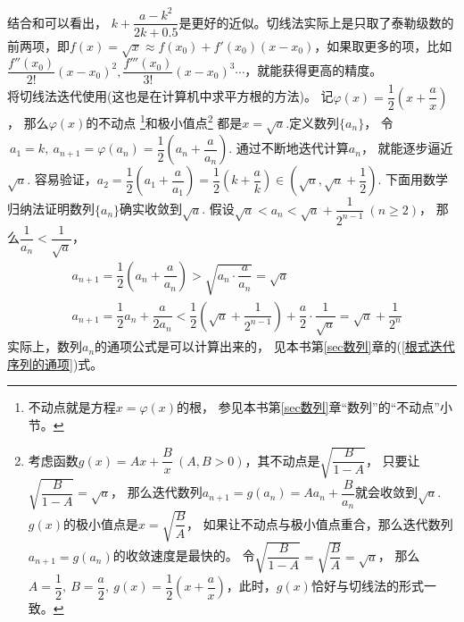 \begin{itemize}[leftmargin=\inteval{\myitemleftmargin}pt,itemsep=
   \inteval{\myitemitempsep}pt,topsep=\inteval{\myitemtopsep}pt]
结合和可以看出，
$ k+\dfrac{a-k^2}{2k+0.5} $是更好的近似。切线法实际上是只取了泰勒级数的前两项，即$ f(x)=\sqrt{x} \approx f(x_0)+f'(x_0)(x-x_0) $，如果取更多的项，比如$ \dfrac{f''(x_0)}{2!}(x-x_0)^2,
\dfrac{f'''(x_0)}{3!}(x-x_0)^3\cdots $，就能获得更高的精度。\\
将切线法迭代使用(这也是在计算机中求平方根的方法)。
记$ \varphi(x)=\dfrac{1}{2}\left(x+\dfrac{a}{x}\right) $，
那么$ \varphi(x) $的不动点
\footnote{不动点就是方程$ x=\varphi(x) $的根，
参见本书第\ref{sec数列}章“数列”的“不动点”小节。}和极小值点\footnote{
考虑函数$ g(x)=Ax+\dfrac{B}{x}\ (A,B>0) $，其不动点是$ \sqrt{\dfrac{B}{1-A}} $，
只要让$ \sqrt{\dfrac{B}{1-A}}=\sqrt{a} $，
那么迭代数列$ a_{n+1}=g(a_n)=Aa_n+\dfrac{B}{a_n} $就会收敛到$ \sqrt{a} $.
$ g(x) $的极小值点是$ x=\sqrt{\dfrac{B}{A}} $，
如果让不动点与极小值点重合，那么迭代数列$ a_{n+1}=g(a_n) $的收敛速度是最快的。
令$ \sqrt{\dfrac{B}{1-A}}=\sqrt{\dfrac{B}{A}}=\sqrt{a} $，
那么$ A=\dfrac{1}{2},\ B=\dfrac{a}{2},\ g(x)=\dfrac{1}{2}\left(
x+\dfrac{a}{x}\right) $，此时，$ g(x) $恰好与切线法的形式一致。}
都是$ x=\sqrt{a} $.定义数列$ \{a_n\} $，
令$\ a_1=k,\ a_{n+1}=\varphi(a_n)=\dfrac{1}{2}\left(
a_n+\dfrac{a}{a_n}\right) $. 通过不断地迭代计算$ a_n $，
就能逐步逼近$ \sqrt{a} $.
容易验证，$ a_{2}=\dfrac{1}{2}\left(a_1+\dfrac{a}{a_1}\right)
=\dfrac{1}{2}\left(k+\dfrac{a}{k}\right)
\in (\sqrt{a},\sqrt{a}+\dfrac{1}{2}) $.
下面用数学归纳法证明数列$ \{a_n\} $确实收敛到$ \sqrt{a} $.
假设$ \sqrt{a}<a_n<\sqrt{a}+\dfrac{1}{2^{n-1}}\ (n\geq 2) $，
那么$ \dfrac{1}{a_n} < \dfrac{1}{\sqrt{a}} $，
\begin{align*}
    & a_{n+1}=\dfrac{1}{2}\left(a_n+\dfrac{a}{a_n}\right)>
    \sqrt{a_n\cdot\dfrac{a}{a_n}}=\sqrt{a} \\ 
    & a_{n+1}=\dfrac{1}{2}a_n+\dfrac{a}{2a_n}<\dfrac{1}{2}
    \left(\sqrt{a}+\dfrac{1}{2^{n-1}} \right)+\dfrac{a}{2}\cdot \dfrac{1}{\sqrt{a}}=\sqrt{a}+\dfrac{1}{2^n}
\end{align*}
实际上，数列$ a_n $的通项公式是可以计算出来的，
见本书第\ref{sec数列}章的(\ref{根式迭代序列的通项})式。 


\end{itemize}
